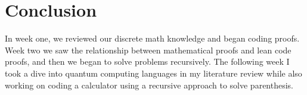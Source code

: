 \documentclass{article}
\begin{document}
\section*{Conclusion}
In week one, we reviewed our discrete math knowledge and began coding proofs. Week two we saw the relationship between mathematical proofs and lean code proofs, and then we began to solve problems recursively. The following week I took a dive into quantum computing languages in my literature review while also working on coding a calculator using a recursive approach to solve parenthesis. 
\end{document}
